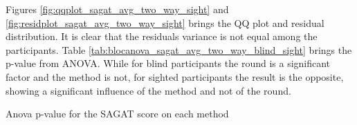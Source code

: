 %
%

Figures \ref{fig:qqplot_sagat_avg_two_way_sight} and \ref{fig:residplot_sagat_avg_two_way_sight} brings the QQ plot and residual distribution. It is clear that the residuals variance is not equal among the participants. Table \ref{tab:blocanova_sagat_avg_two_way_blind_sight} brings the p-value from ANOVA. While for blind participants the round is a significant factor and the method is not, for sighted participants the result is the opposite, showing a significant influence of the method and not of the round.

\begin{table}
    \caption{Anova p-value for the SAGAT score on each method}
    \label{tab:blocanova_sagat_avg_two_way_blind_sight}
\begin{minipage}{0.45\textwidth}
    
\end{minipage}
\begin{minipage}{0.45\textwidth}
        
\end{minipage}
\end{table}

